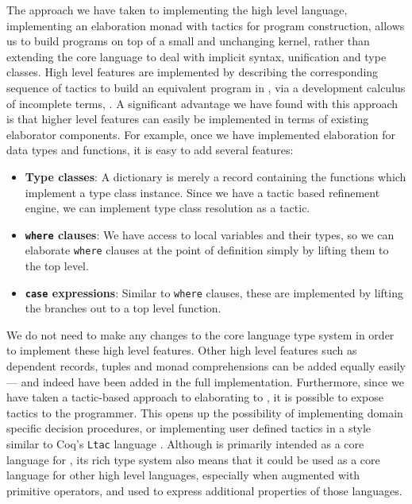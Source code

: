 The approach we have taken to implementing the high level language,
implementing an elaboration monad with tactics for program construction, allows
us to build programs on top of a small and unchanging kernel, rather than
extending the core language to deal with implicit syntax, unification and type
classes.  High level \Idris{} features are implemented by describing the
corresponding sequence of tactics to build an equivalent program in \TT{}, via
a development calculus of incomplete terms, \TTdev{}. A significant advantage
we have found with this approach is that higher level features can easily be
implemented in terms of existing elaborator components. For example, once we
have implemented elaboration for data types and functions, it is easy to add
several features:

\begin{itemize}
\item \textbf{Type classes}: A dictionary is merely a record containing the
functions which implement a type class instance. Since we have a tactic based
refinement engine, we can implement type class resolution as a tactic.
\item \textbf{\texttt{where} clauses}: We have access to local variables and
their types, so we can
elaborate \texttt{where} clauses at the point of definition simply by lifting
them to the top level. 
\item \textbf{\texttt{case} expressions}: Similar to \texttt{where} clauses,
these are implemented by lifting the branches out to a top level function.
\end{itemize}

We do not need to make any changes to the core language type system in order to 
implement these high level features. 
Other high level features such as dependent records, tuples and monad comprehensions
can be added equally easily --- and indeed have been added in the full implementation.  
Furthermore, 
since we have taken a tactic-based approach to elaborating \Idris{} to \TT{},
it is possible to expose tactics to the programmer. This opens up
the possibility of implementing domain specific decision procedures, or
implementing user defined tactics in a style similar to Coq's \texttt{Ltac}
language \cite{Delahaye2000}.  Although \TT{} is primarily intended as a core
language for \Idris{}, its rich type system also means that it could be used
as a core language for other high level languages, especially when augmented
with primitive operators, and used to express additional properties of those
languages.  

